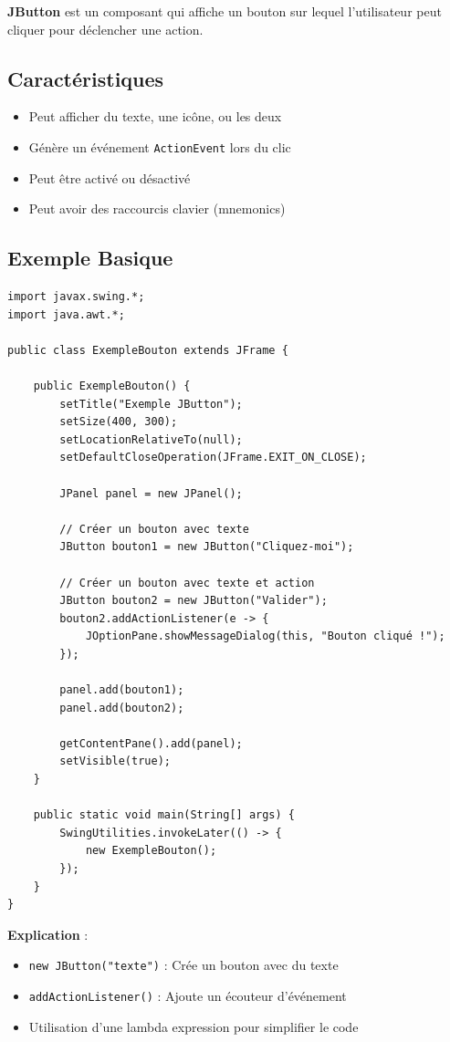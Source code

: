 \documentclass[11pt,a4paper]{article}
\begin{document}
\textbf{JButton} est un composant qui affiche un bouton sur lequel l'utilisateur peut cliquer pour déclencher une action.

\subsection{Caractéristiques}

\begin{itemize}
    \item Peut afficher du texte, une icône, ou les deux
    \item Génère un événement \texttt{ActionEvent} lors du clic
    \item Peut être activé ou désactivé
    \item Peut avoir des raccourcis clavier (mnemonics)
\end{itemize}

\subsection{Exemple Basique}

\begin{lstlisting}
import javax.swing.*;
import java.awt.*;

public class ExempleBouton extends JFrame {
    
    public ExempleBouton() {
        setTitle("Exemple JButton");
        setSize(400, 300);
        setLocationRelativeTo(null);
        setDefaultCloseOperation(JFrame.EXIT_ON_CLOSE);
        
        JPanel panel = new JPanel();
        
        // Créer un bouton avec texte
        JButton bouton1 = new JButton("Cliquez-moi");
        
        // Créer un bouton avec texte et action
        JButton bouton2 = new JButton("Valider");
        bouton2.addActionListener(e -> {
            JOptionPane.showMessageDialog(this, "Bouton cliqué !");
        });
        
        panel.add(bouton1);
        panel.add(bouton2);
        
        getContentPane().add(panel);
        setVisible(true);
    }
    
    public static void main(String[] args) {
        SwingUtilities.invokeLater(() -> {
            new ExempleBouton();
        });
    }
}
\end{lstlisting}

\textbf{Explication} :
\begin{itemize}
    \item \texttt{new JButton("texte")} : Crée un bouton avec du texte
    \item \texttt{addActionListener()} : Ajoute un écouteur d'événement
    \item Utilisation d'une lambda expression pour simplifier le code
\end{itemize}
\end{document}
